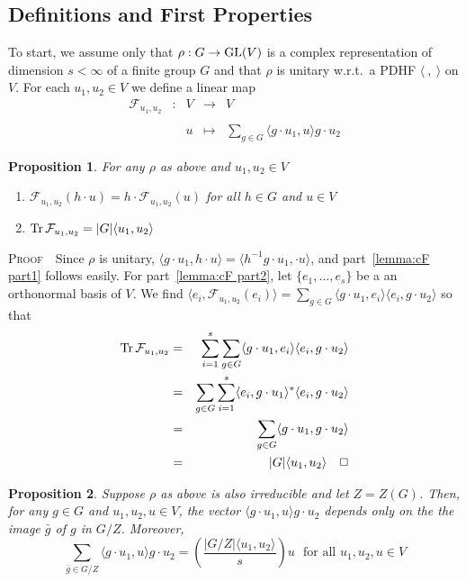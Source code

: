 \documentclass[12pt]{article}
\newtheorem{prop}{Proposition}[section]
\newcommand{\addwords}[1]{\ \ \ \mbox{#1}}
\newcommand{\bPf}{\noindent \textsc{Proof\ }}
\newcommand{\cF}{\ensuremath{\mathcal{F}}}
\newcommand{\displaymapdef}[5]
{
	\begin{array}{rcrcl}
		#1 &:& #2 &\longrightarrow& #3 \\
		& &    &                    \\
		& & #4 &\longmapsto    & #5
	\end{array}
}
\newcommand{\GL}{{\rm GL}}
\newcommand{\inv}{^{-1}}%
\newcommand{\Tr}{{\rm Tr}}
\begin{document}
\subsection{Definitions and First Properties} 
To start, we assume only that  $\rho:G\rightarrow \GL(V)$ is a complex representation of dimension $s<\infty$ of a finite group $G$ and that $\rho$ is unitary w.r.t.\ a PDHF $\langle\ ,\ \rangle$ on $V$. For each $u_1,u_2\in V$ we define a linear map 
$$
\displaymapdef{\cF_{u_1,u_2}}{V}{V}{u}{\sum_{g\in G} \langle  g\cdot u_1, u\rangle g\cdot u_2}
$$
\begin{prop}\label{prop:cF} For any $\rho$ as above and  $u_1,u_2\in V$
\begin{enumerate}
	\item \label{lemma:cF part1} $\cF_{u_1,u_2}(h\cdot u)=h\cdot\cF_{u_1,u_2}(u)$ for all $h\in G$ and $u\in V$
	\item \label{lemma:cF part2} $\Tr\,\cF_{u_1,u_2}=|G|\langle u_1,u_2\rangle$
\end{enumerate}
\end{prop}
\bPf\ Since $\rho$ is unitary,  
$\langle  g\cdot u_1, h\cdot u\rangle=\langle  h\inv g\cdot u_1, \cdot u\rangle$, and part~\ref{lemma:cF part1} follows easily. For part~\ref{lemma:cF part2}, let $\{e_1,\ldots,e_s\}$ be a an orthonormal basis of $V$. We find $\langle e_i, \cF_{u_1,u_2}(e_i)\rangle=\sum_{g\in G}
 \langle  g\cdot u_1, e_i\rangle \langle e_i,g\cdot u_2\rangle$ so that 
 \begin{eqnarray*}
 		\Tr\,\cF_{u_1,u_2}
&=&
 	\sum_{i=1}^s\sum_{g\in G}
 	\langle  g\cdot u_1, e_i\rangle \langle e_i,g\cdot u_2\rangle\\&=&
 	\sum_{g\in G}\sum_{i=1}^s
 	\langle  e_i,  g\cdot u_1\rangle^\ast \langle e_i,g\cdot u_2\rangle\\ &=&
 	\sum_{g\in G}\langle g\cdot u_1, g\cdot u_2\rangle\\ 
 	&=& |G|\langle u_1,u_2\rangle\ \ \ \Box 
 \end{eqnarray*}
 \begin{prop} Suppose $\rho$ as above is also {\em irreducible} and let $Z=Z(G)$. Then, for any $g\in G$ and $u_1,u_2,u\in V$, the vector $\langle  g\cdot u_1, u\rangle g\cdot u_2$ depends only on the the image $\bar{g}$ of $g$ in $G/Z$. Moreover, 
 \begin{equation}\label{eq: pre-pre-Clinometric}
 	\sum_{\bar{g}\in G/Z} \langle  g\cdot u_1, u\rangle g\cdot u_2=\left (\frac{|G/Z|\langle  u_1,u_2\rangle}{s}\right) u\addwords{for all $u_1,u_2,u\in V$}
 \end{equation}
 	\end{prop}
\end{document}
